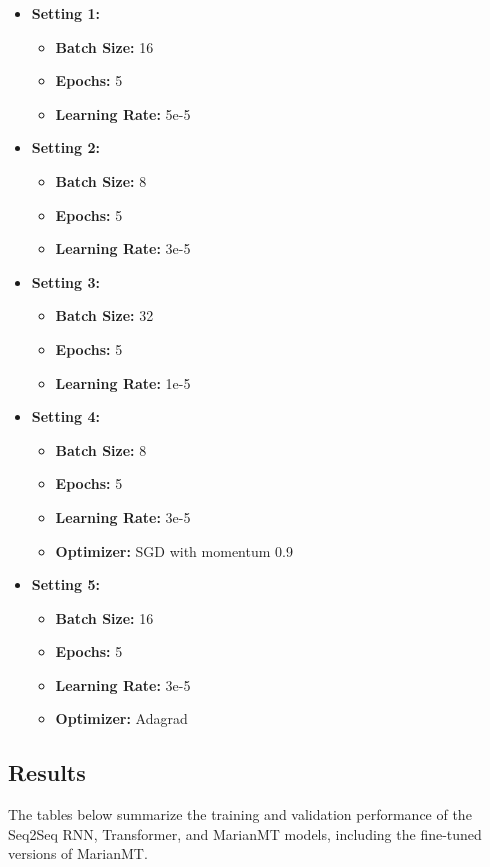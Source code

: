 \documentclass{article}
\begin{document}
\begin{itemize}
\item \textbf{Setting 1:}
  \begin{itemize}
  \item \textbf{Batch Size:} 16
  \item \textbf{Epochs:} 5
  \item \textbf{Learning Rate:} 5e-5
  \end{itemize}
\item \textbf{Setting 2:}
  \begin{itemize}
  \item \textbf{Batch Size:} 8
  \item \textbf{Epochs:} 5
  \item \textbf{Learning Rate:} 3e-5
  \end{itemize}
\item \textbf{Setting 3:}
  \begin{itemize}
  \item \textbf{Batch Size:} 32
  \item \textbf{Epochs:} 5
  \item \textbf{Learning Rate:} 1e-5
  \end{itemize}
\item \textbf{Setting 4:}
  \begin{itemize}
  \item \textbf{Batch Size:} 8
  \item \textbf{Epochs:} 5
  \item \textbf{Learning Rate:} 3e-5
  \item \textbf{Optimizer:} SGD with momentum 0.9
  \end{itemize}
\item \textbf{Setting 5:}
  \begin{itemize}
  \item \textbf{Batch Size:} 16
  \item \textbf{Epochs:} 5
  \item \textbf{Learning Rate:} 3e-5
  \item \textbf{Optimizer:} Adagrad
  \end{itemize}
\end{itemize}

\subsection{Results}
The tables below summarize the training and validation performance of the Seq2Seq RNN, Transformer, and MarianMT models, including the fine-tuned versions of MarianMT.
\end{document}

